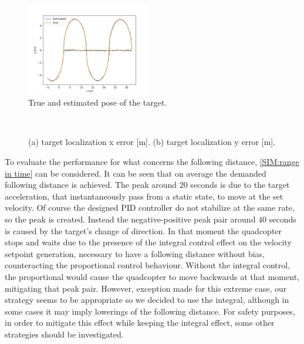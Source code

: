 \begin{figure}
    \centering
    \includegraphics[width=0.48\textwidth]{images/Simulation/tag_estimation_vs_real.png}
    \caption{True and estimated pose of the target.}
    \label{SIM:target estimation}
\end{figure}

\begin{figure}
     \centering     
     \\
     \caption{(a) target localization x error [m]. (b) target localization y error [m].}
     \label{SIM:loc err}
\end{figure}

To evaluate the performance for what concerns the following distance, \autoref{SIM:range in time} can be considered. It can be seen that on average the demanded following distance is achieved. The peak around $20$ seconds is due to the target acceleration, that instantaneously pass from a static state, to move at the set velocity. Of course the designed PID controller do not stabilize at the same rate, so the peak is created. Instead the negative-positive peak pair around $40$ seconds is caused by the target's change of direction. In that moment the quadcopter stops and waits due to the presence of the integral control effect on the velocity setpoint generation, necessary to have a following distance without bias, counteracting the proportional control behaviour. Without the integral control, the proportional would cause the quadcopter to move backwards at that moment, mitigating that peak pair. However, exception made for this extreme case, our strategy seems to be appropriate so we decided to use the integral, although in some cases it may imply lowerings of the following distance. For safety purposes, in order to mitigate this effect while keeping the integral effect, some other strategies should be investigated.\\

